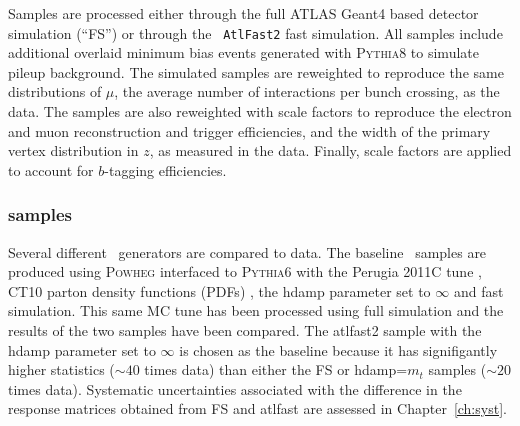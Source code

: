 Samples are processed either through the full ATLAS Geant4\cite{bib:g4} based detector simulation (``FS'') or through the \texttt{ AtlFast2}\cite{atlfast2} fast simulation. All samples include additional overlaid minimum bias events generated with \textsc{  Pythia8} \cite{pythia8} to simulate pileup background. 
The simulated samples are reweighted to reproduce the same distributions of $\mu$, the average number of interactions per bunch crossing, as the data. The samples are also reweighted with scale factors to reproduce the electron and muon reconstruction and trigger efficiencies, and the width of the primary vertex distribution in $z$, as measured in the data. Finally, scale factors are applied to account for $b$-tagging efficiencies. 

\subsubsection{\ttbar samples}\label{ss:mcsignal}

Several different \ttbar\ generators are compared to data. The baseline \ttbar\ samples are produced using \textsc{  Powheg} \cite{Powheg, Powheg2, Powheg3, Powheg4} interfaced to \textsc{  Pythia6} \cite{pythia6} with the Perugia 2011C tune \cite{perugia}, CT10 parton density functions (PDFs) \cite{cttenpdf}, the hdamp parameter set to $\infty$ and fast simulation.  
This same MC tune has been processed using full simulation and the results of the two samples have been compared.
The atlfast2 sample with the hdamp parameter set to $\infty$ is chosen as the baseline because it has signifigantly higher statistics ($\sim 40$ times data) than either the FS or hdamp=$m_t$ samples ($\sim 20$ times data).
Systematic uncertainties associated with the difference in the response matrices obtained from FS and atlfast are
assessed in Chapter~\ref{ch:syst}.



